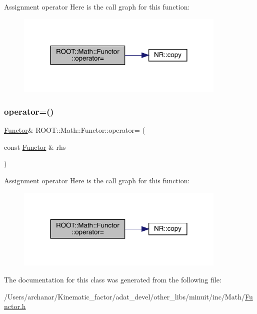 Assignment operator Here is the call graph for this function\+:
\nopagebreak
\begin{figure}[H]
\begin{center}
\leavevmode
\includegraphics[width=284pt]{da/d8e/classROOT_1_1Math_1_1Functor_a24bd9cdf7e31e443bff64c5fb4378c99_cgraph}
\end{center}
\end{figure}
\mbox{\label{classROOT_1_1Math_1_1Functor_a24bd9cdf7e31e443bff64c5fb4378c99}} 
\subsubsection{\texorpdfstring{operator=()}{operator=()}\hspace{0.1cm}{\footnotesize\ttfamily [2/2]}}
{\footnotesize\ttfamily \mbox{\hyperlink{classROOT_1_1Math_1_1Functor}{Functor}}\& R\+O\+O\+T\+::\+Math\+::\+Functor\+::operator= (\begin{DoxyParamCaption}\item[{const \mbox{\hyperlink{classROOT_1_1Math_1_1Functor}{Functor}} \&}]{rhs }\end{DoxyParamCaption})\hspace{0.3cm}{\ttfamily [inline]}}

Assignment operator Here is the call graph for this function\+:
\nopagebreak
\begin{figure}[H]
\begin{center}
\leavevmode
\includegraphics[width=284pt]{da/d8e/classROOT_1_1Math_1_1Functor_a24bd9cdf7e31e443bff64c5fb4378c99_cgraph}
\end{center}
\end{figure}


The documentation for this class was generated from the following file\+:\begin{DoxyCompactItemize}
\item 
/\+Users/archanar/\+Kinematic\+\_\+factor/adat\+\_\+devel/other\+\_\+libs/minuit/inc/\+Math/\mbox{\hyperlink{other__libs_2minuit_2inc_2Math_2Functor_8h}{Functor.\+h}}\end{DoxyCompactItemize}
